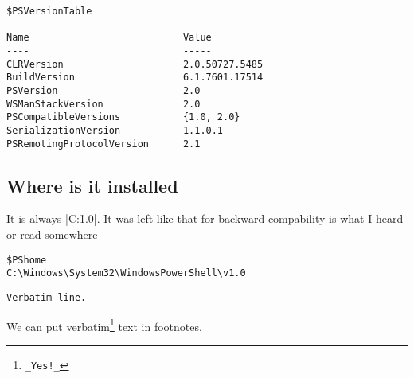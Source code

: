 \begin{verbatim}
$PSVersionTable

Name                           Value                                                                                   
----                           -----                                                                                   
CLRVersion                     2.0.50727.5485                                                                          
BuildVersion                   6.1.7601.17514                                                                          
PSVersion                      2.0                                                                                     
WSManStackVersion              2.0                                                                                     
PSCompatibleVersions           {1.0, 2.0}                                                                              
SerializationVersion           1.1.0.1                                                                                 
PSRemotingProtocolVersion      2.1                                                                                     

\end{verbatim}

\subsection{Where is it installed}

It is always |C:\Windows{}\WindowsPowershell\v1.0|. It was left like that for backward compability is what I heard or read somewhere

\begin{verbatim}
$PShome
C:\Windows\System32\WindowsPowerShell\v1.0
\end{verbatim}



\begin{Verbatim}[gobble=2,fontsize=\footnotesize,fontfamily=tt]
   Verbatim line.
\end{Verbatim}

\VerbatimFootnotes
We can put verbatim\footnote{\verb+_Yes!_+} text in footnotes.

